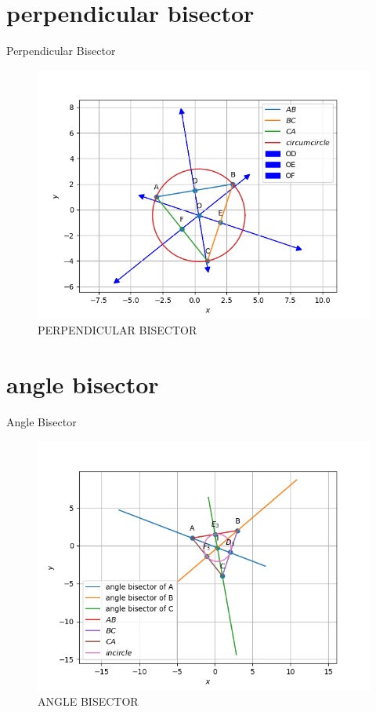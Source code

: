 \documentclass[journal,12pt,onecolumn]{IEEEtran}
\theoremstyle{remark}
\begin{document}
\begin{table}[!ht]
	\section{perpendicular bisector}
	\centering
	
	\caption{Perpendicular Bisector}
	\label{table:Perpendicular Bisector}
\end{table}
\begin{figure}
\includegraphics[width=\columnwidth]{./figs/Q1.4.1.png}
\caption{PERPENDICULAR BISECTOR}
\label{fig:perpendicular bisector}
\end{figure}
\begin{table}[!ht]
	\section{angle bisector}
	\centering
	
	\caption{Angle Bisector}
	\label{table:Angle Bisector}
\end{table}
\begin{figure}
\includegraphics[width=\columnwidth]{./figs/Q1.5.1.png}
\caption{ANGLE BISECTOR}
\label{fig:angle bisector}
\end{figure}
\end{document}
